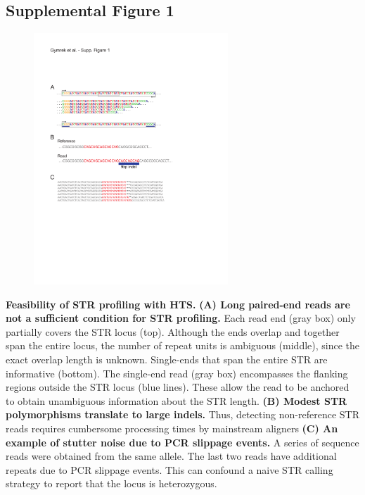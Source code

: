 {\subsection{Supplemental Figure 1}
\begin{figure}[h!]
\centering
\label{fig:lobsup1}
\includegraphics[width=0.65\textwidth]{Figures/Chapter2/SuppFig1.pdf}
\end{figure}
\textbf{Feasibility of STR profiling with HTS.} \textbf{(A) Long paired-end reads are not a sufficient condition for STR profiling.} Each read end (gray box) only partially covers the STR locus (top). Although the ends overlap and together span the entire locus, the number of repeat units is ambiguous (middle), since the exact overlap length is unknown. Single-ends that span the entire STR are informative (bottom). The single-end read (gray box) encompasses the flanking regions outside the STR locus (blue lines). These allow the read to be anchored to obtain unambiguous information about the STR length. \textbf{(B) Modest STR polymorphisms translate to large indels.} Thus, detecting non-reference STR reads requires cumbersome processing times by mainstream aligners \textbf{(C) An example of stutter noise due to PCR slippage events.} A series of sequence reads were obtained from the same allele. The last two reads have additional repeats due to PCR slippage events. This can confound a naive STR calling strategy to report that the locus is heterozygous.

\pagebreak
}
